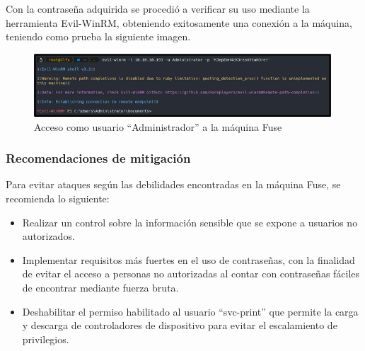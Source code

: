 Con la contraseña adquirida se procedió a verificar su uso mediante la herramienta Evil-WinRM, obteniendo exitosamente una conexión a la máquina, teniendo como prueba la siguiente imagen.
\begin{figure}[H]
    \centering
    \includegraphics[width=0.99\textwidth]{imagenes/acadfuse.png}
    \caption{Acceso como usuario ``Administrador'' a la máquina Fuse}
\end{figure}
\subsubsection{Recomendaciones de mitigación}
Para evitar ataques según las debilidades encontradas en la máquina Fuse, se recomienda lo siguiente:
\begin{itemize}
    \item Realizar un control sobre la información sensible que se expone a usuarios no autorizados.
    \item Implementar requisitos más fuertes en el uso de contraseñas, con la finalidad de evitar el acceso a personas no autorizadas al contar con contraseñas fáciles de encontrar mediante fuerza bruta.
    \item Deshabilitar el permiso habilitado al usuario “svc-print” que permite la carga y descarga de controladores de dispositivo para evitar el escalamiento de privilegios.
\end{itemize}